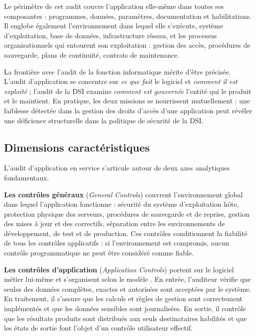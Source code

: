 Le périmètre de cet audit couvre l'application elle-même dans toutes ses composantes : programmes, données, paramètres, documentation et habilitations. Il englobe également l'environnement dans lequel elle s'exécute, système d'exploitation, base de données, infrastructure réseau, et les processus organisationnels qui entourent son exploitation : gestion des accès, procédures de sauvegarde, plans de continuité, contrats de maintenance.

La frontière avec l'audit de la fonction informatique mérite d'être précisée. L'audit d'application se concentre sur \textit{ce que fait} le logiciel et \textit{comment il est exploité} ; l'audit de la DSI examine \textit{comment est gouvernée} l'entité qui le produit et le maintient. En pratique, les deux missions se nourrissent mutuellement : une faiblesse détectée dans la gestion des droits d'accès d'une application peut révéler une déficience structurelle dans la politique de sécurité de la DSI.

\subsection{Dimensions caractéristiques}

L'audit d'application en service s'articule autour de deux axes analytiques fondamentaux.

\textbf{Les contrôles généraux} (\textit{General Controls}) couvrent l'environnement global dans lequel l'application fonctionne : sécurité du système d'exploitation hôte, protection physique des serveurs, procédures de sauvegarde et de reprise, gestion des mises à jour et des correctifs, séparation entre les environnements de développement, de test et de production. Ces contrôles conditionnent la fiabilité de tous les contrôles applicatifs : si l'environnement est compromis, aucun contrôle programmatique ne peut être considéré comme fiable.

\textbf{Les contrôles d'application} (\textit{Application Controls}) portent sur le logiciel métier lui-même et s'organisent selon le modèle . En entrée, l'auditeur vérifie que seules des données complètes, exactes et autorisées sont acceptées par le système. En traitement, il s'assure que les calculs et règles de gestion sont correctement implémentés et que les données sensibles sont journalisées. En sortie, il contrôle que les résultats produits sont distribués aux seuls destinataires habilités et que les états de sortie font l'objet d'un contrôle utilisateur effectif.

